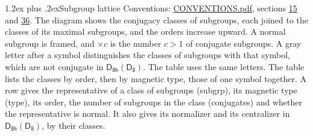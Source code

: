 \documentclass[10pt,a4paper]{article}
\makeatletter
\renewcommand\section{\@startsection{section}{1}{\z@}{-3ex plus -1ex minus -.2ex}%
  {1.2ex plus .2ex}{\normalfont\large\sffamily\bfseries\color{parttitle}}}
\numberwithin{equation}{section}
\newcommand{\grp}[1]{\mathsf{#1}}
\makeatother
\begin{document}
\section{Subgroup lattice}\label{s:subgroups}
Conventions: \href{../../CONVENTIONS.pdf}{CONVENTIONS.pdf}, sections \href{../../../rotation/CONVENTIONS.pdf\#conv.15}{15} and \href{../../CONVENTIONS.pdf\#conv.36}{36}.
The diagram shows the conjugacy classes of subgroups, each joined to the classes of its maximal subgroups, and the orders increase upward. \label{n:index.conjugates.c}\label{n:mark.conjugates}A normal subgroup is framed, and ${\times}c$ is the number $c > 1$ of conjugate subgroups. \label{n:mark.letter}A gray letter after a symbol distinguishes the classes of subgroups with that symbol, which are not conjugate in $\grp{D_{8h}}(\grp{D_{8}})$. The table uses the same letters. The table lists the classes by order, then by magnetic type, those of one symbol together. \label{n:head.subgroup}\label{n:head.magnetic.type}\label{n:head.order}\label{n:head.conjugates}\label{n:head.normal}A row gives the representative of a class of subgroups (subgrp), its magnetic type (type), its order, the number of subgroups in the class (conjugates) and whether the representative is normal. \label{n:head.normalizer}\label{n:head.centralizer}It also gives its normalizer and its centralizer in $\grp{D_{8h}}(\grp{D_{8}})$, by their classes. 
\end{document}

